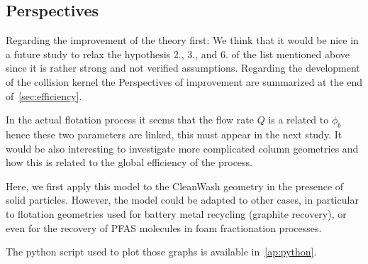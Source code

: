 \subsection{Perspectives}

Regarding the improvement of the theory first:
We think that it would be nice in a future study to relax the hypothesis 2., 3., and 6. of the list mentioned above since it is rather strong and not verified assumptions. 
Regarding the development of the collision kernel the Perspectives of improvement are summarized at the end of~\ref{sec:efficiency}. 

In the actual flotation process it seems that the flow rate $Q$ is a related to $\phi_b$ hence these two parameters are linked, this must appear in the next study. 
It would be also interesting to investigate more complicated column geometries and how this is related to the global efficiency of the process. 




Here, we first apply this model to the CleanWash geometry in the presence of solid particles. 
However, the model could be adapted to other cases, in particular to flotation geometries used for battery metal recycling (graphite recovery), or even for the recovery of PFAS molecules in foam fractionation processes. 

The python script used to plot those graphs is available in~\ref{ap:python}. 

